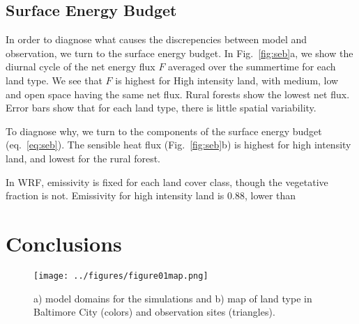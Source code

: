\documentclass[draft,linenumbers]{agujournal}
\begin{document}
\subsection{Surface Energy Budget}
In order to diagnose what causes the discrepencies between model and observation, we turn to the surface energy budget. In Fig.~\ref{fig:seb}a, we show the diurnal cycle of the net energy flux $F$ averaged over the summertime for each land type. We see that $F$ is highest for  High intensity land, with medium, low and open space having the same net flux. Rural forests show the lowest net flux. Error bars show that for each land type, there is little spatial variability.  

To diagnose why, we turn to the components of the surface energy budget (eq.~\ref{eq:seb}). The sensible heat flux (Fig.~\ref{fig:seb}b) is highest for high intensity land, and lowest for the rural forest. 

In WRF, emissivity is fixed for each land cover class, though the vegetative fraction is not. Emissivity for high intensity land is $0.88$, lower than 

\section{Conclusions}\label{sec:conclusions}






%
%
%
%
\begin{figure}[h]
\centering
\texttt{[image: ../figures/figure01map.png]}
\caption{a) model domains for the simulations and b) map of land type in Baltimore City (colors) and observation sites (triangles).}
\label{fig:map}
 \end{figure}
 
\end{document}
